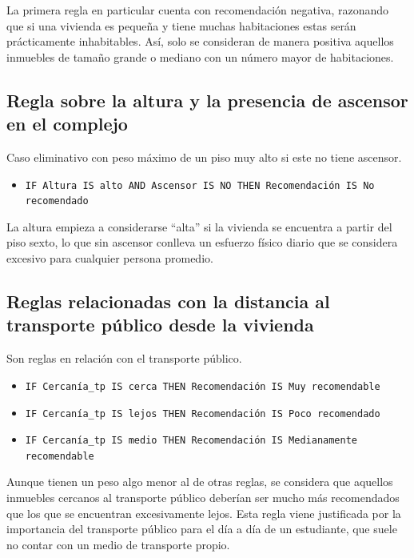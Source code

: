 \documentclass[12pt]{report} %
\begin{document}
    La primera regla en particular cuenta con recomendación negativa, razonando que si una vivienda es pequeña 
    y tiene muchas habitaciones estas serán prácticamente inhabitables. Así, solo se consideran de manera 
    positiva aquellos inmuebles de tamaño grande o mediano con un número mayor de habitaciones.

    \subsection{Regla sobre la altura y la presencia de ascensor en el complejo}
    Caso eliminativo con peso máximo de un piso muy alto si este no tiene ascensor. 

    \begin{itemize}
        \item \texttt{IF Altura IS alto AND Ascensor IS NO THEN Recomendación IS No\\recomendado}
    \end{itemize}

    La altura empieza a considerarse ``alta'' si la vivienda se encuentra a partir del piso sexto, 
    lo que sin ascensor conlleva un esfuerzo físico diario que se considera excesivo para cualquier 
    persona promedio.

    \subsection{Reglas relacionadas con la distancia al transporte público desde la vivienda}
    Son reglas en relación con el transporte público.

    \begin{itemize}
        \item \texttt{IF Cercanía\_tp IS cerca THEN Recomendación IS Muy recomendable}
        \item \texttt{IF Cercanía\_tp IS lejos THEN Recomendación IS Poco recomendado}
        \item \texttt{IF Cercanía\_tp IS medio THEN Recomendación IS Medianamente\\recomendable}
    \end{itemize}
    
    Aunque tienen un peso algo menor al de otras
    reglas, se considera que aquellos inmuebles cercanos al transporte público deberían ser mucho 
    más recomendados que los que se encuentran excesivamente lejos. Esta regla viene justificada
    por la importancia del transporte público para el día a día de un estudiante, que suele no contar 
    con un medio de transporte propio.
\end{document}

